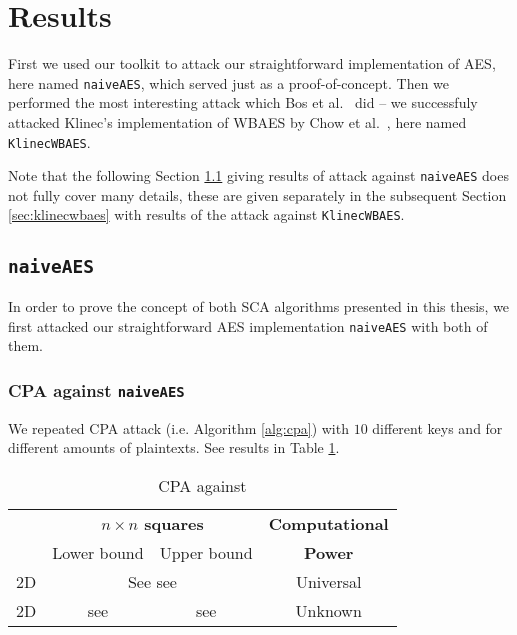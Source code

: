 \section{Results}
\label{sec:results}

First we used our toolkit to attack our straightforward implementation of AES, here named {\tt naiveAES}, which served just as a proof-of-concept. Then we performed the most interesting attack which Bos et al.\ \cite{bos2015differential} did -- we successfuly attacked Klinec's implementation \cite{klinec2013implementation} of WBAES by Chow et al.\ \cite{chow2003aes}, here named {\tt KlinecWBAES}.

Note that the following Section \ref{sec:naiveaes} giving results of attack against {\tt naiveAES} does not fully cover many details, these are given separately in the subsequent Section \ref{sec:klinecwbaes} with results of the attack against {\tt KlinecWBAES}.



\subsection{\tt naiveAES}
\label{sec:naiveaes}

In order to prove the concept of both SCA algorithms presented in this thesis, we first attacked our straightforward AES implementation {\tt naiveAES} with both of them.

\subsubsection{CPA against {\tt naiveAES}}
	
	We repeated CPA attack (i.e. Algorithm \ref{alg:cpa}) with $10$ different keys and for different amounts of plaintexts. See results in Table \ref{tab:naiveaes}.
	
	\begin{table}[H]
		\begin{center}
		\begin{tabular}{| c | c | c | c |}
			\hline
			~ & \multicolumn{2}{c|}{\bf $n\times n$ squares} & {\bf Computational} \\
			~ & \multicolumn{1}{c}{Lower bound} & \multicolumn{1}{c|}{Upper bound} & {\bf Power}\\
			\hline
			2D & \multicolumn{2}{c|}{See see} & Universal \\
			\hline
			2D & see & see & Unknown \\
			\hline
		\end{tabular}
		\end{center}
	\caption{CPA against }
	\label{tab:naiveaes}
	\end{table}

